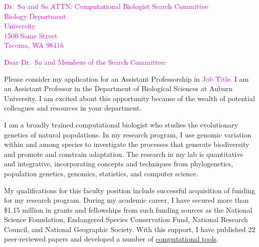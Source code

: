 \documentclass[letterpaper, 10pt]{letter}
\newcommand{\highlight}[1]{\textcolor{magenta}{#1}}
\begin{document}
\begin{letter}{
        \highlight{
        Dr.\ So  and So
        ATTN: Computational Biologist Search Committee \\
        Biology Department \\
        University \\
        1500 Some Street \\
        Tacoma, WA 98416
        }
    }
\opening{
    \highlight{
    Dear Dr.\ So and Members of the Search Committee:
    }
}
Please consider my application for an Assistant Professorship in
\highlight{
Job Title.
}
I am an Assistant Professor in the Department of Biological Sciences at Auburn
University.
I am excited about this opportunity because of the wealth of potential
colleagues and resources in your department.

I am a broadly trained
computational biologist
who studies the evolutionary genetics of
natural populations.
In my research program, I use genomic variation within and among species to
investigate the processes that generate biodiversity and promote and constrain
adaptation.
The research in my lab is quantitative and integrative, incorporating concepts
and techniques from
phylogenetics,
population genetics,
genomics,
statistics,
and 
computer science.

My qualifications for this faculty position include successful acquisition
of funding for my research program.
During my academic career, I have secured more than
\$1.15 million
in grants and fellowships from such funding sources as the 
National Science Foundation,
Endangered Species Conservation Fund,
National Research Council,
and
National Geographic Society.
With this support, I have
published 22 peer-reviewed papers and
developed a number of
\href{http://phyletica.org/software/}{computational tools}.


\end{letter}
\end{document}
